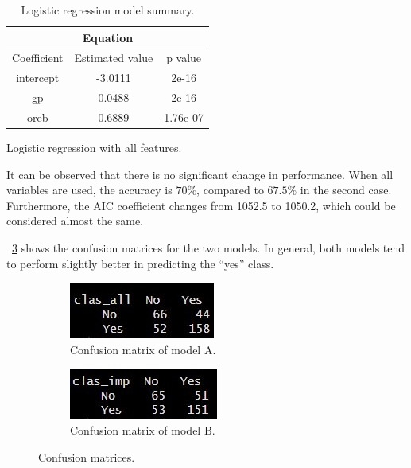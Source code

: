 \begin{table}[h]
	\hfill
	\begin{subtable}[h]{0.45\textwidth}
		\centering
		\begin{tabular}{||c | c | c ||} 
			\hline
			\multicolumn{3}{|c|}{Equation} \\
			\hline
			Coefficient & Estimated value & p value \\
			\hline
			intercept & -3.0111 & 2e-16 \\
			gp & 0.0488 & 2e-16 \\
			oreb & 0.6889 & 1.76e-07 \\		
			\hline
		\end{tabular}
		\caption{Logistic regression with all features.}
		\label{table:LRImpSum}
	\end{subtable}
	\caption{Logistic regression model summary.}
	\label{table:LRSum}
\end{table}

It can be observed that there is no significant change in performance. When all variables are used, the accuracy is $70\%$, compared to $67.5\%$ in the second case. Furthermore, the AIC coefficient changes from 1052.5 to 1050.2, which could be considered almost the same. 

\Fig~\ref{fig:CM} shows the confusion matrices for the two models. In general, both models tend to perform slightly better in predicting the ``yes'' class.

\begin{figure}[h]
	\begin{subfigure}{.6\textwidth}
		\centering
		\includegraphics[width=0.7\linewidth]{ImageFiles/Classification/LogReg/log_reg_tt_all_pred_table}
		\caption{Confusion matrix of model A.}
		\label{fig:CMA}
	\end{subfigure}
	\begin{subfigure}{.6\textwidth}
		\centering
		\includegraphics[width=0.7\linewidth]{ImageFiles/Classification/LogReg/log_reg_tt_imp_pred_table}
		\caption{Confusion matrix of model B.}
		\label{fig:CMB}
	\end{subfigure}
	\caption{Confusion matrices.}
	\label{fig:CM}
\end{figure}

